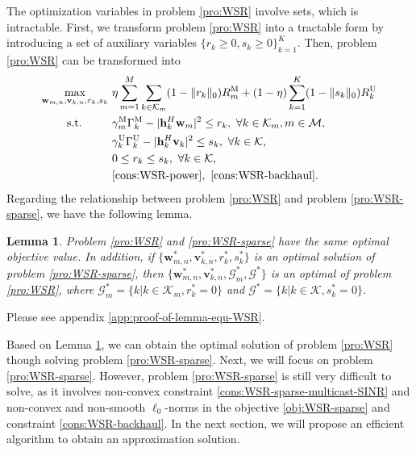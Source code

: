 \documentclass[12pt, draftclsnofoot, onecolumn]{IEEEtran}
\newtheorem{lemma}{Lemma}
\begin{document}
The optimization variables in problem \eqref{pro:WSR} involve sets, which is intractable. First, we transform problem \eqref{pro:WSR} into a tractable form by introducing a set of auxiliary variables $\{r_{k} \geq 0, s_{k} \geq 0 \}_{k=1}^K$. Then, problem \eqref{pro:WSR} can be transformed into
\begin{subequations}
\begin{align} 
\mathop{\text{max}}_{\mathbf{w}_{m,n}, \mathbf{v}_{k,n}, r_{k}, s_{k}} ~& \eta \sum_{m=1}^M \sum_{k \in \mathcal{K}_m} (1- \lVert r_{k} \lVert_0 ) R_{m}^{\text{M}} + (1 - \eta) \sum_{k=1}^K (1- \lVert s_{k} \lVert_0 ) R_k^{\text{U}} \label{obj:WSR-sparse} \\ 
\text{s.t.} \qquad ~~ & \gamma_{m}^{\text{M}} \Gamma_{k}^{\text{M}} - \lvert \mathbf{h}_k^H \mathbf{w}_{m} \rvert^2 \leq r_{k},~\forall k \in \mathcal{K}_{m}, m \in \mathcal{M}, \label{cons:WSR-sparse-multicast-SINR} \\
& \gamma_{k}^{\text{U}} \Gamma_{k}^{\text{U}} - \lvert \mathbf{h}_k^H \mathbf{v}_{k} \rvert^2 \leq s_{k},~\forall k \in \mathcal{K}, \label{cons:WSR-sparse-unicast-SINR} \\
& 0 \leq r_{k} \leq s_{k},~\forall k \in \mathcal{K}, \label{cons:WSR-sparse-order} \\
& \eqref{cons:WSR-power},~\eqref{cons:WSR-backhaul}. \nonumber
\end{align} \label{pro:WSR-sparse}
\end{subequations}
Regarding the relationship between problem \eqref{pro:WSR} and problem \eqref{pro:WSR-sparse}, we have the following lemma.
\begin{lemma} \label{lem:equ-WSR}
Problem \eqref{pro:WSR} and \eqref{pro:WSR-sparse} have the same optimal objective value. In addition, if \allowbreak $\{\mathbf{w}_{m,n}^*, \mathbf{v}_{k,n}^*, r_{k}^*, s_{k}^*\}$ is an optimal solution of problem \eqref{pro:WSR-sparse}, then $\{\mathbf{w}_{m,n}^*, \mathbf{v}_{k,n}^*, \mathcal{G}_m^*, \mathcal{G}^*\}$ is an optimal of problem \eqref{pro:WSR}, where $\mathcal{G}_m^* = \{k | k \in \mathcal{K}_m, r_{k}^* = 0 \}$ and $\mathcal{G}^* = \{k | k \in \mathcal{K}, s_{k}^* = 0 \}$.
\end{lemma}
\begin{IEEEproof}
Please see appendix \ref{app:proof-of-lemma-equ-WSR}.
\end{IEEEproof}
Based on Lemma \ref{lem:equ-WSR}, we can obtain the optimal solution of problem \eqref{pro:WSR} though solving problem \eqref{pro:WSR-sparse}. Next, we will focus on problem \eqref{pro:WSR-sparse}. However, problem \eqref{pro:WSR-sparse} is still very difficult to solve, as it involves non-convex constraint \eqref{cons:WSR-sparse-multicast-SINR} and non-convex and non-smooth $\ell_0$-norms in the objective \eqref{obj:WSR-sparse} and constraint \eqref{cons:WSR-backhaul}. In the next section, we will propose an efficient algorithm to obtain an approximation solution.
\end{document}
